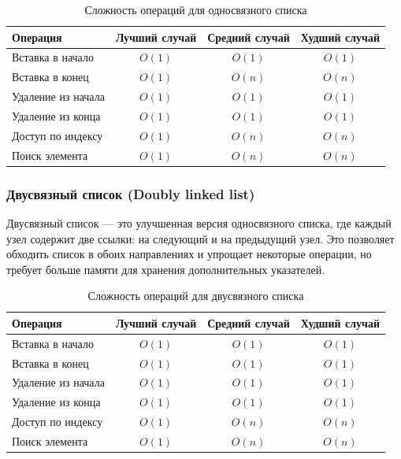 \documentclass[a4paper,12pt]{article}
\begin{document}
\begin{table}[H]
    \centering
    \begin{tabular}{|l|c|c|c|}
        \hline
        Операция & Лучший случай & Средний случай & Худший случай \\
        \hline
        Вставка в начало & $O(1)$ & $O(1)$ & $O(1)$ \\
        \hline
        Вставка в конец & $O(1)$ & $O(n)$ & $O(n)$ \\
        \hline
        Удаление из начала & $O(1)$ & $O(1)$ & $O(1)$ \\
        \hline
        Удаление из конца & $O(1)$ & $O(1)$ & $O(1)$ \\
        \hline
        Доступ по индексу & $O(1)$ & $O(n)$ & $O(n)$ \\
        \hline
        Поиск элемента & $O(1)$ & $O(n)$ & $O(n)$ \\
        \hline
    \end{tabular}
    \caption{Сложность операций для односвязного списка}
\end{table}

\subsubsection{Двусвязный список (Doubly linked list)}
\label{subsubsec:двусвязный-список-doubly-linked-list}

Двусвязный список --- это улучшенная версия односвязного списка, где каждый узел содержит две ссылки: на следующий и на предыдущий узел. Это позволяет обходить список в обоих направлениях и упрощает некоторые операции, но требует больше памяти для хранения дополнительных указателей.

\begin{table}[H]
    \centering
    \begin{tabular}{|l|c|c|c|}
        \hline
        Операция & Лучший случай & Средний случай & Худший случай \\
        \hline
        Вставка в начало & $O(1)$ & $O(1)$ & $O(1)$ \\
        \hline
        Вставка в конец & $O(1)$ & $O(1)$ & $O(1)$ \\
        \hline
        Удаление из начала & $O(1)$ & $O(1)$ & $O(1)$ \\
        \hline
        Удаление из конца & $O(1)$ & $O(1)$ & $O(1)$ \\
        \hline
        Доступ по индексу & $O(1)$ & $O(n)$ & $O(n)$ \\
        \hline
        Поиск элемента & $O(1)$ & $O(n)$ & $O(n)$ \\
        \hline
    \end{tabular}
    \caption{Сложность операций для двусвязного списка}
\end{table}
\end{document}
